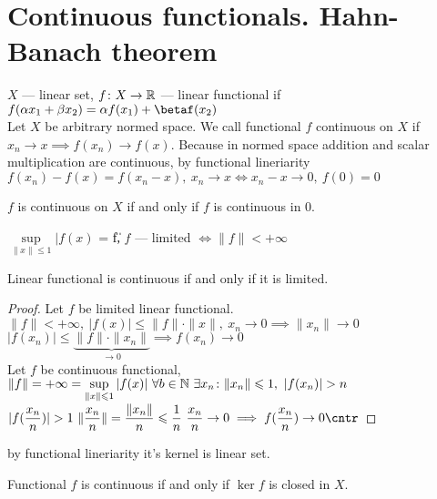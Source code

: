 \section{Continuous functionals. Hahn-Banach theorem}
$X$ --- linear set, $f \colon X \to \mathbb{R}$ --- linear functional if $f(\alpha x_1 +
\beta x_2) = \alpha f(x_1) + \betaf(x_2)$ \\
Let $X$ be arbitrary normed space. We call functional $f$ continuous on $X$ if
$x_n \to x \implies f(x_n) \to f(x)$. Because in normed space addition and
scalar multiplication are continuous, by functional lineriarity $f(x_n) - f(x) =
f(x_n - x),\ x_n \to x \iff x_n - x \to 0,\ f(0) = 0$\\

\begin{stm}
  $f$ is continuous on $X$ if and only if $f$ is continuous in 0.
\end{stm}
\noindent

\begin{defn}
  $\sup\limits_{\|x\| \leq 1}{|f(x)}$ = \|f\|, $f$ --- limited $\iff \|f\| < +\infty$
\end{defn}

\begin{thm}
  Linear functional is continuous if and only if it is limited.
\end{thm}

\begin{proof}
  Let $f$ be limited linear functional. $\|f\| < +\infty,\ |f(x)| \leq
  \|f\| \cdot \|x\|,\ x_n \to 0 \implies \|x_n\| \to 0$ \\
 $|f(x_n)| \leq \underbrace{\|f\| \cdot \|x_n\|}_{\to 0} \implies f(x_n) \to 0$ \\
 Let $f$ be continuous functional, $\|f\| = +\infty = \sup\limits_{\|x\| \leq
   1}|f(x)|\ \forall b \in \N\ \exists x_n \colon \|x_n\| \leq 1,\ |f(x_n)| > n$ \\
 $|f(\dfrac{x_n}{n})| > 1\ \|\dfrac{x_n}{n}\| = \dfrac{\|x_n\|}{n} \leq
 \dfrac{1}{n}\ \dfrac{x_n}{n} \to 0 \implies f(\dfrac{x_n}{n}) \to 0 \cntr$
\end{proof}

\begin{note}
  by functional lineriarity it's kernel is linear set.
\end{note}

\begin{thm}
  Functional $f$ is continuous if and only if $\ker{f}$ is closed in $X$.
\end{thm}

